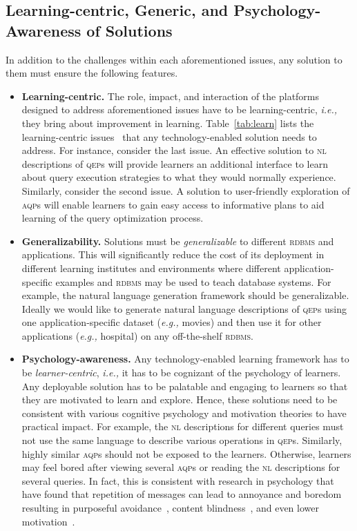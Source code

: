 \documentclass[11pt]{article}
\newcommand{\ie}{\emph{i.e.,}\xspace}
\newcommand{\eg}{\emph{e.g.,}\xspace}
\begin{document}
\subsection{Learning-centric, Generic, and Psychology-Awareness of Solutions}  \label{sec:issue}
In addition to the challenges within each aforementioned issues, any solution to them must ensure the following features.

\begin{itemize} \itemsep = -0.5ex

\item \textbf{Learning-centric.} The role, impact, and interaction of the platforms designed to address aforementioned issues have to be learning-centric, \ie they bring about improvement in learning. Table~\ref{tab:learn} lists the learning-centric issues~\cite{HXK12} that any technology-enabled solution needs to address. For instance, consider the last issue. An effective solution to \textsc{nl} descriptions of \textsc{qep}s will provide learners an additional interface to learn about query execution strategies to what they would normally experience. Similarly, consider the second issue. A solution to user-friendly exploration of \textsc{aqp}s will enable learners to gain easy access to informative plans to aid learning of the query optimization process. 
 
\item \textbf{Generalizability.}  Solutions must be \textit{generalizable} to different \textsc{rdbms} and applications. This will significantly reduce the cost of its deployment in different learning institutes and environments where different application-specific examples and \textsc{rdbms} may be used to teach database systems. For example, the natural language generation framework should be generalizable.  Ideally we would like to generate natural language descriptions of \textsc{qep}s using one application-specific dataset (\eg movies) and then use it for other applications (\eg hospital) on any off-the-shelf \textsc{rdbms}. 

\item  \textbf{Psychology-awareness.} Any technology-enabled learning framework has to be \textit{learner-centric}, \ie it has to be cognizant of the psychology of learners. Any deployable  solution has to be palatable and engaging to learners so that they are motivated to learn and explore. Hence, these solutions need to be consistent with various cognitive psychology and motivation theories to have practical impact. For example, the \textsc{nl} descriptions for different queries must not use the same language to describe various operations in \textsc{qep}s. Similarly, highly similar \textsc{aqp}s should not be exposed to the learners. Otherwise, learners may feel bored after viewing several \textsc{aqp}s or reading the \textsc{nl} descriptions for several queries. In fact, this is consistent with research in psychology that have found that repetition of messages can lead to annoyance and boredom~\cite{CP79} resulting in purposeful avoidance~\cite{HK13}, content blindness~\cite{HG+11}, and even lower motivation~\cite{SPC90}.
\end{itemize}
\end{document}
